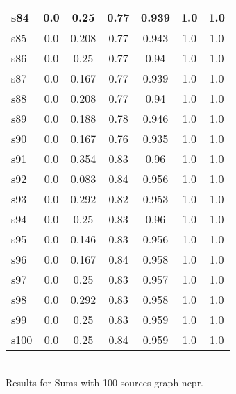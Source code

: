 \documentclass{article}
\begin{document}
\begin{tabular}{|l|c|c|c|c|c|c|}
\hline
s84 &0.0 & 0.25 & 0.77 & 0.939 & 1.0 & 1.0\\
\hline
s85 &0.0 & 0.208 & 0.77 & 0.943 & 1.0 & 1.0\\
\hline
s86 &0.0 & 0.25 & 0.77 & 0.94 & 1.0 & 1.0\\
\hline
s87 &0.0 & 0.167 & 0.77 & 0.939 & 1.0 & 1.0\\
\hline
s88 &0.0 & 0.208 & 0.77 & 0.94 & 1.0 & 1.0\\
\hline
s89 &0.0 & 0.188 & 0.78 & 0.946 & 1.0 & 1.0\\
\hline
s90 &0.0 & 0.167 & 0.76 & 0.935 & 1.0 & 1.0\\
\hline
s91 &0.0 & 0.354 & 0.83 & 0.96 & 1.0 & 1.0\\
\hline
s92 &0.0 & 0.083 & 0.84 & 0.956 & 1.0 & 1.0\\
\hline
s93 &0.0 & 0.292 & 0.82 & 0.953 & 1.0 & 1.0\\
\hline
s94 &0.0 & 0.25 & 0.83 & 0.96 & 1.0 & 1.0\\
\hline
s95 &0.0 & 0.146 & 0.83 & 0.956 & 1.0 & 1.0\\
\hline
s96 &0.0 & 0.167 & 0.84 & 0.958 & 1.0 & 1.0\\
\hline
s97 &0.0 & 0.25 & 0.83 & 0.957 & 1.0 & 1.0\\
\hline
s98 &0.0 & 0.292 & 0.83 & 0.958 & 1.0 & 1.0\\
\hline
s99 &0.0 & 0.25 & 0.83 & 0.959 & 1.0 & 1.0\\
\hline
s100 &0.0 & 0.25 & 0.84 & 0.959 & 1.0 & 1.0\\
\hline
\end{tabular}\\

\noindent Results for Sums with 100 sources graph ncpr.
\end{document}

